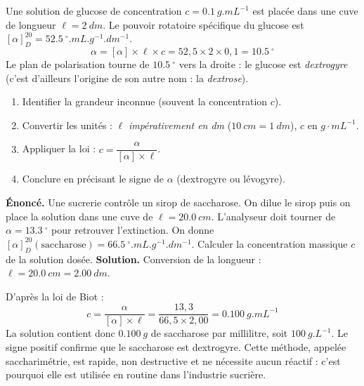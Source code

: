 \documentclass[11pt]{article}
\providecommand{\degree}{^{\circ}}
\newcommand{\cle}[1]{{\popxbold\color{popdark}#1}}
\begin{document}
\begin{exemplebox}
Une solution de glucose de concentration $c = \SI{0,1}{g.mL^{-1}}$ est placée dans une cuve de longueur $\ell = \SI{2}{dm}$. Le pouvoir rotatoire spécifique du glucose est $[\alpha]_D^{20} = \SI{+52,5}{\degree.mL.g^{-1}.dm^{-1}}$.
\[ \alpha = [\alpha] \times \ell \times c = 52,5 \times 2 \times 0,1 = \SI{+10,5}{\degree} \]
Le plan de polarisation tourne de $\SI{10,5}{\degree}$ vers la droite : le glucose est \emph{dextrogyre} (c'est d'ailleurs l'origine de son autre nom : la \emph{dextrose}).
\end{exemplebox}

\begin{methode}
\begin{enumerate}
\item Identifier la grandeur inconnue (souvent la concentration $c$).
\item Convertir les unités : $\ell$ \emph{impérativement en dm} ($\SI{10}{cm} = \SI{1}{dm}$), $c$ en $g\cdot mL^{-1}$.
\item Appliquer la loi : $c = \dfrac{\alpha}{[\alpha]\times \ell}$.
\item Conclure en précisant le signe de $\alpha$ (dextrogyre ou lévogyre).
\end{enumerate}
\end{methode}

\begin{exoresolu}
\textbf{Énoncé.} Une sucrerie contrôle un sirop de saccharose. On dilue le sirop puis on place la solution dans une cuve de $\ell = \SI{20,0}{cm}$. L'analyseur doit tourner de $\alpha = \SI{+13,3}{\degree}$ pour retrouver l'extinction. On donne $[\alpha]_D^{20}(\text{saccharose}) = \SI{+66,5}{\degree.mL.g^{-1}.dm^{-1}}$. Calculer la concentration massique $c$ de la solution dosée.
\tcblower
\textbf{Solution.} Conversion de la longueur : $\ell = \SI{20,0}{cm} = \SI{2,00}{dm}$.\par
D'après la loi de Biot :
\[ c = \frac{\alpha}{[\alpha]\times \ell} = \frac{13,3}{66,5 \times 2,00} = \SI{0,100}{g.mL^{-1}} \]
La solution contient donc $\SI{0,100}{g}$ de saccharose par millilitre, soit $\SI{100}{g.L^{-1}}$. Le signe positif confirme que le saccharose est dextrogyre. Cette méthode, appelée \cle{saccharimétrie}, est rapide, non destructive et ne nécessite aucun réactif : c'est pourquoi elle est utilisée en routine dans l'industrie sucrière.
\end{exoresolu}
\end{document}

